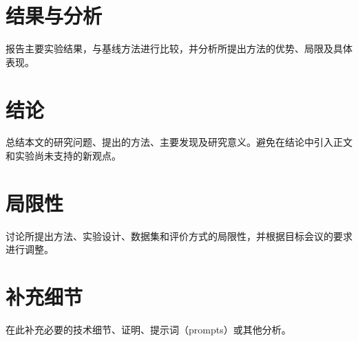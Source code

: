 \documentclass[11pt]{article}
\begin{document}

\section{结果与分析}

报告主要实验结果，与基线方法进行比较，并分析所提出方法的优势、局限及具体表现。

\section{结论}

总结本文的研究问题、提出的方法、主要发现及研究意义。避免在结论中引入正文和实验尚未支持的新观点。

\section*{局限性}

讨论所提出方法、实验设计、数据集和评价方式的局限性，并根据目标会议的要求进行调整。

%
%




\appendix

\section{补充细节}

在此补充必要的技术细节、证明、提示词（prompts）或其他分析。
\end{document}

